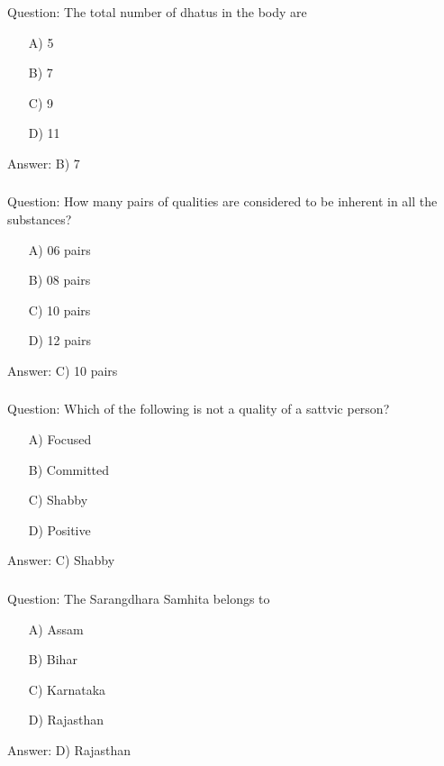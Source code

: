 \begin{frame}[fragile]\frametitle{}

Question: The total number of dhatus in the body are

\begin{itemize}
\item[A)] 5
\item[B)] 7
\item[C)] 9
\item[D)] 11
\end{itemize}

Answer: B) 7
\end{frame}

\begin{frame}[fragile]\frametitle{}

Question: How many pairs of qualities are considered to be inherent in all the substances?

\begin{itemize}
\item[A)] 06 pairs
\item[B)] 08 pairs
\item[C)] 10 pairs
\item[D)] 12 pairs
\end{itemize}

Answer: C) 10 pairs
\end{frame}

\begin{frame}[fragile]\frametitle{}

Question: Which of the following is not a quality of a sattvic person?

\begin{itemize}
\item[A)] Focused
\item[B)] Committed
\item[C)] Shabby
\item[D)] Positive
\end{itemize}

Answer: C) Shabby
\end{frame}

\begin{frame}[fragile]\frametitle{}

Question: The Sarangdhara Samhita belongs to

\begin{itemize}
\item[A)] Assam
\item[B)] Bihar
\item[C)] Karnataka
\item[D)] Rajasthan
\end{itemize}

Answer: D) Rajasthan
\end{frame}

